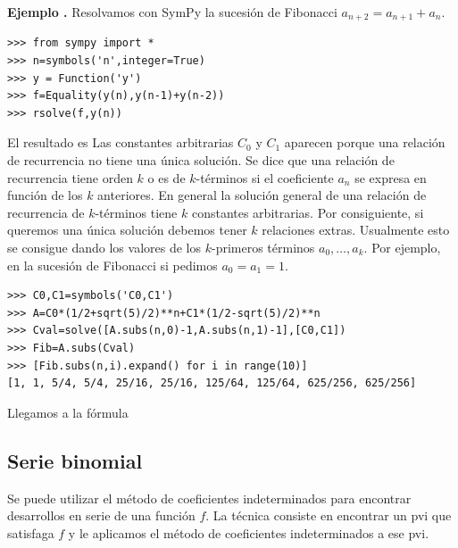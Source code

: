 \documentclass{article}
\newcounter{ejemplo_cont}
\newenvironment{ejemplo}{\noindent\textbf{Ejemplo  \arabic{ejemplo_cont}.} }{\addtocounter{ejemplo_cont}{1}}
\begin{document}
\begin{ejemplo} Resolvamos con SymPy la sucesión de Fibonacci $a_{n+2}=a_{n+1}+a_n$.
\begin{lstlisting}
>>> from sympy import *
>>> n=symbols('n',integer=True)
>>> y = Function('y')
>>> f=Equality(y(n),y(n-1)+y(n-2))
>>> rsolve(f,y(n))
\end{lstlisting}

 El resultado es
Las constantes arbitrarias $C_0$ y $C_1$ aparecen porque una relación de recurrencia no tiene una única solución. Se dice que una relación de recurrencia tiene orden $k$ o es de $k$-términos si el coeficiente $a_n$ se expresa en función de los $k$  anteriores. En general la solución general de una relación de recurrencia de $k$-términos tiene $k$ constantes arbitrarias. Por consiguiente, si queremos una única solución debemos tener $k$ relaciones extras. Usualmente esto se consigue dando los valores de los $k$-primeros términos $a_0,\ldots,a_k$. Por ejemplo, en  la sucesión de Fibonacci si pedimos $a_0=a_1=1$.

\begin{lstlisting}
>>> C0,C1=symbols('C0,C1')
>>> A=C0*(1/2+sqrt(5)/2)**n+C1*(1/2-sqrt(5)/2)**n
>>> Cval=solve([A.subs(n,0)-1,A.subs(n,1)-1],[C0,C1])
>>> Fib=A.subs(Cval)
>>> [Fib.subs(n,i).expand() for i in range(10)]
[1, 1, 5/4, 5/4, 25/16, 25/16, 125/64, 125/64, 625/256, 625/256]
\end{lstlisting}
Llegamos a la fórmula

\end{ejemplo}

\subsection{Serie binomial}

 Se puede utilizar el método de coeficientes indeterminados para encontrar desarrollos en serie de una función  $f$. La técnica consiste en encontrar un pvi que satisfaga $f$ y le aplicamos el método de coeficientes indeterminados a ese pvi.
\end{document}
